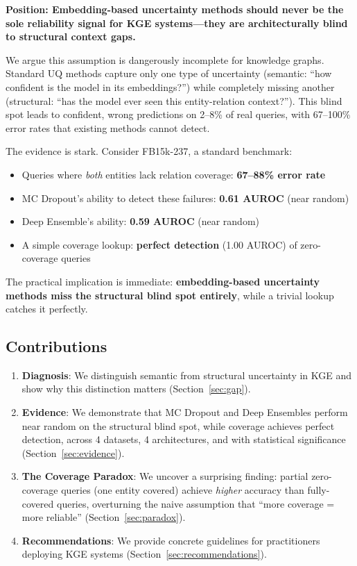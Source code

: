 \documentclass{article}
\begin{document}
\textbf{Position: Embedding-based uncertainty methods should never be the sole reliability signal for KGE systems---they are architecturally blind to structural context gaps.}

We argue this assumption is dangerously incomplete for knowledge graphs. Standard UQ methods capture only one type of uncertainty (semantic: ``how confident is the model in its embeddings?'') while completely missing another (structural: ``has the model ever seen this entity-relation context?''). This blind spot leads to confident, wrong predictions on 2--8\% of real queries, with 67--100\% error rates that existing methods cannot detect.

The evidence is stark. Consider FB15k-237, a standard benchmark:
\begin{itemize}
    \item Queries where \emph{both} entities lack relation coverage: \textbf{67--88\% error rate}
    \item MC Dropout's ability to detect these failures: \textbf{0.61 AUROC} (near random)
    \item Deep Ensemble's ability: \textbf{0.59 AUROC} (near random)
    \item A simple coverage lookup: \textbf{perfect detection} (1.00 AUROC) of zero-coverage queries
\end{itemize}

The practical implication is immediate: \textbf{embedding-based uncertainty methods miss the structural blind spot entirely}, while a trivial lookup catches it perfectly.

\subsection{Contributions}

\begin{enumerate}
    \item \textbf{Diagnosis}: We distinguish semantic from structural uncertainty in KGE and show why this distinction matters (Section~\ref{sec:gap}).

    \item \textbf{Evidence}: We demonstrate that MC Dropout and Deep Ensembles perform near random on the structural blind spot, while coverage achieves perfect detection, across 4 datasets, 4 architectures, and with statistical significance (Section~\ref{sec:evidence}).

    \item \textbf{The Coverage Paradox}: We uncover a surprising finding: partial zero-coverage queries (one entity covered) achieve \emph{higher} accuracy than fully-covered queries, overturning the naive assumption that ``more coverage = more reliable'' (Section~\ref{sec:paradox}).

    \item \textbf{Recommendations}: We provide concrete guidelines for practitioners deploying KGE systems (Section~\ref{sec:recommendations}).
\end{enumerate}
\end{document}
